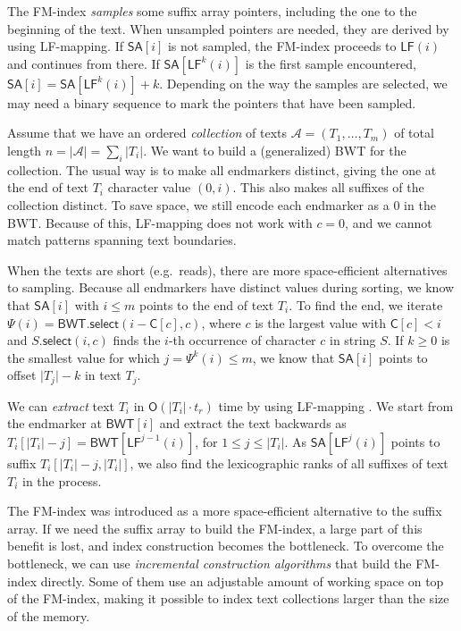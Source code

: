 \documentclass[smallabstract,smallcaptions]{dccpaper}
\newcommand{\abs}[1]{\ensuremath{\lvert #1 \rvert}}
\newcommand{\Oh}{\ensuremath{\mathsf{O}}}
\newcommand{\BWT}{\textsf{BWT}}
\newcommand{\mSA}{\ensuremath{\mathsf{SA}}}
\newcommand{\mBWT}{\ensuremath{\mathsf{BWT}}}
\newcommand{\mC}{\ensuremath{\mathsf{C}}}
\newcommand{\LF}{\textsf{LF}}
\newcommand{\mLF}{\ensuremath{\mathsf{LF}}}
\newcommand{\mselect}{\ensuremath{\mathsf{select}}}
\newcommand{\Acoll}{\ensuremath{\mathcal{A}}}
\begin{document}
The FM-index \emph{samples} some suffix array pointers, including the one to the beginning of the text. When unsampled pointers are needed, they are derived by using \LF\nobreakdash-mapping. If $\mSA[i]$ is not sampled, the FM-index proceeds to $\mLF(i)$ and continues from there. If $\mSA[\mLF^{k}(i)]$ is the first sample encountered, $\mSA[i] = \mSA[\mLF^{k}(i)] + k$.
Depending on the way the samples are selected, we may need a binary sequence to mark the pointers that have been sampled.

Assume that we have an ordered \emph{collection} of texts $\Acoll = (T_{1}, \dotsc, T_{m})$ of total length $n = \abs{\Acoll} = \sum_{i} \abs{T_{i}}$. We want to build a (generalized) \BWT{} for the collection. The usual way is to make all endmarkers distinct, giving the one at the end of text $T_{i}$ character value $(0,i)$. This also makes all suffixes of the collection distinct. To save space, we still encode each endmarker as a $0$ in the \BWT{}. Because of this, \LF\nobreakdash-mapping does not work with $c = 0$, and we cannot match patterns spanning text boundaries.

When the texts are short (e.g.~reads), there are more space-efficient alternatives to sampling. Because all endmarkers have distinct values during sorting, we know that $\mSA[i]$ with $i \le m$ points to the end of text $T_{i}$. To find the end, we iterate $\Psi(i) = \mBWT.\mselect(i - \mC[c], c)$, where $c$ is the largest value with $\mC[c] < i$ and $S.\mselect(i,c)$ finds the $i$\nobreakdash-th occurrence of character $c$ in string $S$. If $k \ge 0$ is the smallest value for which $j = \Psi^{k}(i) \le m$, we know that $\mSA[i]$ points to offset $\abs{T_{j}} - k$ in text $T_{j}$.

We can \emph{extract} text $T_{i}$ in $\Oh(\abs{T_{i}} \cdot t_{r})$ time by using \LF\nobreakdash-mapping \cite{Burrows1994}. We start from the endmarker at $\mBWT[i]$ and extract the text backwards as $T_{i}[\abs{T_{i}} - j] = \mBWT[\LF^{j-1}(i)]$, for $1 \le j \le \abs{T_{i}}$. As $\mSA[\LF^{j}(i)]$ points to suffix $T_{i}[\abs{T_{i}}-j, \abs{T_{i}}]$, we also find the lexicographic ranks of all suffixes of text $T_{i}$ in the process.


\Section{Space-efficient \BWT{} construction}

The FM-index was introduced as a more space-efficient alternative to the suffix array. If we need the suffix array to build the FM-index, a large part of this benefit is lost, and index construction becomes the bottleneck. To overcome the bottleneck, we can use \emph{incremental construction algorithms} that build the FM-index directly. Some of them use an adjustable amount of working space on top of the FM-index, making it possible to index text collections larger than the size of the memory.
\end{document}

